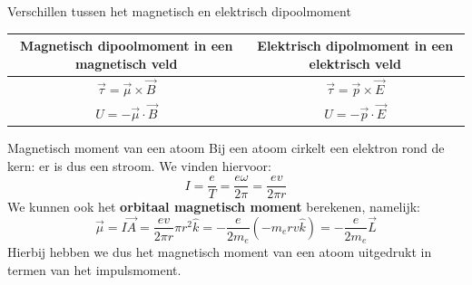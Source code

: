 \begin{vrg}{Verschillen tussen het magnetisch en elektrisch dipoolmoment}
    \vspace{-0.3cm}
    \def\arraystretch{2}
    \centering
    \begin{tabular}{c|c}
       Magnetisch dipoolmoment in een magnetisch veld & Elektrisch dipolmoment in een elektrisch veld \\ \hline
        $\Vec{\tau} = \Vec{\mu} \times \Vec{B}$ & $\Vec{\tau} = \Vec{p} \times \Vec{E}$ \\ 
        $U = -\Vec{\mu} \cdot \Vec{B}$ & $U = -\Vec{p} \cdot \Vec{E}$ \\
    \end{tabular}
    \vspace{-0.2cm}
\end{vrg}

\begin{app}{Magnetisch moment van een atoom}
    Bij een atoom cirkelt een elektron rond de kern: er is dus een stroom. We vinden hiervoor:
    \begin{equation*}
        I = \dfrac{e}{T} = \dfrac{e\omega}{2\pi} = \dfrac{ev}{2\pi r}
    \end{equation*}
    We kunnen ook het \textbf{orbitaal magnetisch moment} berekenen, namelijk: 
    \begin{equation*}
        \Vec{\mu} = I\Vec{A} = \dfrac{ev}{2\pi r} \pi r^{2} \hat{k} = -\dfrac{e}{2m_{e}}(-m_{e}rv\hat{k}) = -\dfrac{e}{2m_{e}}\Vec{L}
    \end{equation*}
    Hierbij hebben we dus het magnetisch moment van een atoom uitgedrukt in termen van het impulsmoment. 
    \vspace{0cm}
\end{app}

\newpage


